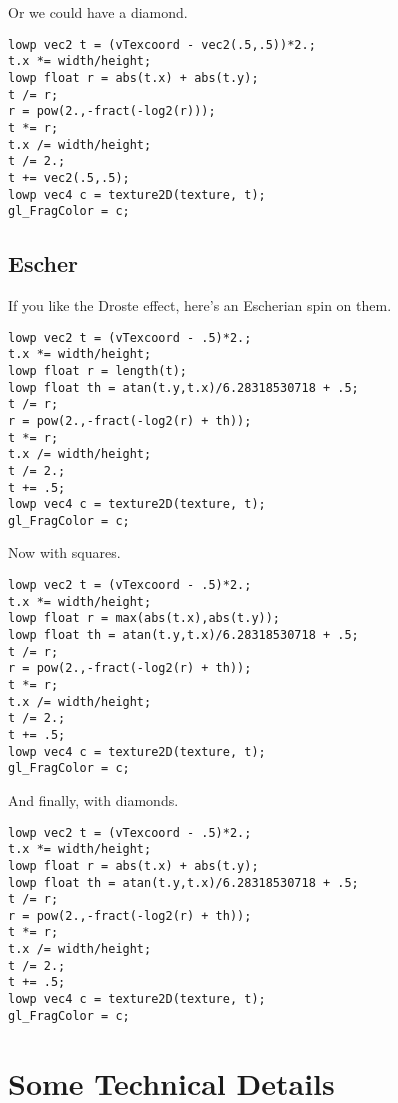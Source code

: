 \documentclass[
  html5,%
  mathml,%
  use filename%
]{internet}
\makeatletter
\let\prev@sec=\section
\renewcommand\section{\clearpage\prev@sec}
\makeatother
\begin{document}
Or we could have a diamond.

\begin{tcolorbox}
\begin{verbatim}
lowp vec2 t = (vTexcoord - vec2(.5,.5))*2.;
t.x *= width/height;
lowp float r = abs(t.x) + abs(t.y);
t /= r;
r = pow(2.,-fract(-log2(r)));
t *= r;
t.x /= width/height;
t /= 2.;
t += vec2(.5,.5);
lowp vec4 c = texture2D(texture, t);
gl_FragColor = c;
\end{verbatim}
\end{tcolorbox}

\subsection{Escher}

If you like the Droste effect, here's an Escherian spin on them.

\begin{tcolorbox}
\begin{verbatim}
lowp vec2 t = (vTexcoord - .5)*2.;
t.x *= width/height;
lowp float r = length(t);
lowp float th = atan(t.y,t.x)/6.28318530718 + .5;
t /= r;
r = pow(2.,-fract(-log2(r) + th));
t *= r;
t.x /= width/height;
t /= 2.;
t += .5;
lowp vec4 c = texture2D(texture, t);
gl_FragColor = c;
\end{verbatim}
\end{tcolorbox}

Now with squares.

\begin{tcolorbox}
\begin{verbatim}
lowp vec2 t = (vTexcoord - .5)*2.;
t.x *= width/height;
lowp float r = max(abs(t.x),abs(t.y));
lowp float th = atan(t.y,t.x)/6.28318530718 + .5;
t /= r;
r = pow(2.,-fract(-log2(r) + th));
t *= r;
t.x /= width/height;
t /= 2.;
t += .5;
lowp vec4 c = texture2D(texture, t);
gl_FragColor = c;
\end{verbatim}
\end{tcolorbox}


And finally, with diamonds.

\begin{tcolorbox}
\begin{verbatim}
lowp vec2 t = (vTexcoord - .5)*2.;
t.x *= width/height;
lowp float r = abs(t.x) + abs(t.y);
lowp float th = atan(t.y,t.x)/6.28318530718 + .5;
t /= r;
r = pow(2.,-fract(-log2(r) + th));
t *= r;
t.x /= width/height;
t /= 2.;
t += .5;
lowp vec4 c = texture2D(texture, t);
gl_FragColor = c;
\end{verbatim}
\end{tcolorbox}

\section{Some Technical Details}
\end{document}
